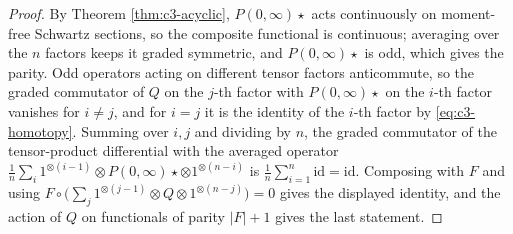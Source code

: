 \begin{proof}
By Theorem \ref{thm:c3-acyclic}, $P(0,\infty)\star$ acts continuously on moment-free Schwartz sections, so the composite functional is continuous; averaging over the $n$ factors keeps it graded symmetric, and $P(0,\infty)\star$ is odd, which gives the parity. Odd operators acting on different tensor factors anticommute, so the graded commutator of $Q$ on the $j$-th factor with $P(0,\infty)\star$ on the $i$-th factor vanishes for $i\neq j$, and for $i=j$ it is the identity of the $i$-th factor by \eqref{eq:c3-homotopy}. Summing over $i,j$ and dividing by $n$, the graded commutator of the tensor-product differential with the averaged operator $\frac1n\sum_i1^{\otimes(i-1)}\otimes P(0,\infty)\star\otimes1^{\otimes(n-i)}$ is $\frac1n\sum_{i=1}^n\mathrm{id}=\mathrm{id}$. Composing with $F$ and using $F\circ\big(\sum_j1^{\otimes(j-1)}\otimes Q\otimes1^{\otimes(n-j)}\big)=0$ gives the displayed identity, and the action of $Q$ on functionals of parity $|F|+1$ gives the last statement.
\end{proof}

